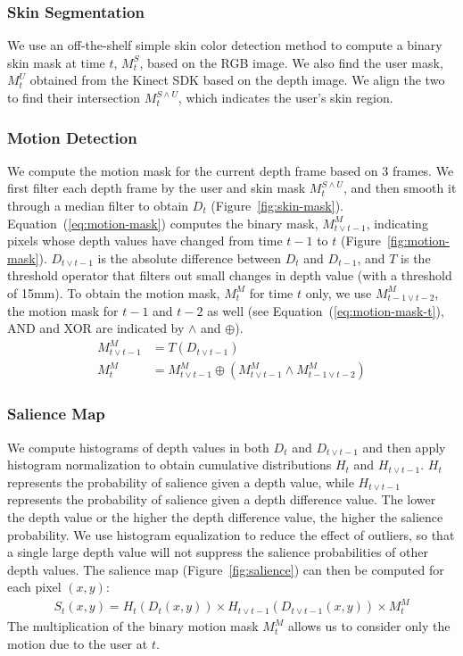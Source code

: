 \documentclass{acm_proc_article-sp}
\begin{document}
\subsubsection{Skin Segmentation}
We use an off-the-shelf simple skin color detection method to compute a binary skin mask at
time $t$, $M_t^S$, based on the RGB image. We also find the user mask, $M_t^U$ obtained from the Kinect SDK based on the depth image. 
We align the two to find their intersection $M_t^{S\wedge U}$, which indicates the user's skin region.

\subsubsection{Motion Detection}
We compute the motion mask for the current depth frame based on 3 frames. We first filter each 
depth frame by the user and skin mask $M_t^{S\wedge U}$, and then
smooth it through a median filter to obtain $D_t$ (Figure~\ref{fig:skin-mask}).
Equation~(\ref{eq:motion-mask}) computes the binary mask, $M_{t\vee t-1}^M$, 
indicating pixels whose depth values have changed from time $t-1$ to $t$ (Figure~\ref{fig:motion-mask}).
$D_{t\vee t-1}$ is the absolute difference between $D_t$ and $D_{t-1}$, and $T$ is the threshold operator that filters out small changes in depth value 
(with a threshold of 15mm). 
To obtain the motion mask, $M_{t}^M$ for time $t$ only, we use $M_{t-1\vee t-2}^M$, the motion mask for $t-1$ and $t-2$ as well (see Equation~(\ref{eq:motion-mask-t}),
 AND and XOR are indicated by $\wedge$ and $\oplus$).
\begin{align}
M_{t\vee t-1}^M &= T(D_{t\vee t-1}) \label{eq:motion-mask} \\
M_{t}^M &= M_{t\vee t-1}^M \oplus (M_{t\vee t-1}^M \wedge M_{t-1\vee t-2}^M) \label{eq:motion-mask-t}
\end{align}

\subsubsection{Salience Map}
We compute histograms of depth values in both $D_t$ and $D_{t\vee t-1}$ and then apply histogram normalization to obtain cumulative distributions $H_t$ and $H_{t\vee t-1}$.
$H_t$ represents the probability of salience given a depth value, while $H_{t\vee t-1}$ represents the probability of salience given
a depth difference value. The lower the depth value or the higher the depth difference value, the higher the salience probability. We use
histogram equalization to reduce the effect of outliers, so that a single large depth value will not suppress the salience probabilities of other depth values. 
The salience map (Figure~\ref{fig:salience}) can then be computed for each pixel $(x, y)$:
\begin{align*}
S_t(x, y) = H_t(D_t(x, y)) \times H_{t\vee t-1}(D_{t\vee t-1}(x, y)) \times M_t^M
\end{align*}
The multiplication of the binary motion mask $M_t^M$ allows us to consider only the motion due to the user at $t$.
 
\end{document}
